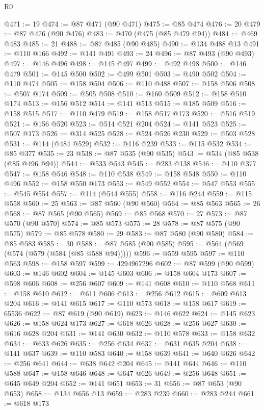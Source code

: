 \begin{lexlean}{R0}
\begin{coremodule}
@471 := 19
@474 := @87 @471 (@90 @471)
@475 := @85 @474
@476 := 20
@479 := @87 @476 (@90 @476)
@483 := @470 (@475 (@85 @479 @94))
@484 := @469 @483
@485 := 21
@488 := @87 @485 (@90 @485)
@490 := @134 @488 @13
@491 := @110 @166
@492 := @141 @491
@493 := 24
@496 := @87 @493 (@90 @493)
@497 := @146 @496
@498 := @145 @497
@499 := @492 @498
@500 := @146 @479
@501 := @145 @500
@502 := @499 @501
@503 := @490 @502
@504 := @110 @474
@505 := @158 @504
@506 := @110 @488
@507 := @158 @506
@508 := @507 @174
@509 := @505 @508
@510 := @160 @509
@512 := @158 @510 @174
@513 := @156 @512
@514 := @141 @513
@515 := @185 @509
@516 := @158 @515
@517 := @110 @479
@519 := @158 @517 @173
@520 := @516 @519
@521 := @156 @520
@523 := @514 @521 @204
@524 := @141 @523
@525 := @507 @173
@526 := @314 @525
@528 := @524 @526 @230
@529 := @503 @528
@531 := @114 (@484 @529)
@532 := @116 @239
@533 := @115 @532
@534 := @85 @377
@535 := 23
@538 := @87 @535 (@90 @535)
@543 := @534 (@85 @538 (@85 @496 @94))
@544 := @533 @543
@545 := @283 @138
@546 := @110 @377
@547 := @158 @546
@548 := @110 @538
@549 := @158 @548
@550 := @110 @496
@552 := @158 @550 @173
@553 := @549 @552
@554 := @547 @553
@555 := @545 @554
@557 := @114 (@544 @555)
@558 := @116 @244
@559 := @115 @558
@560 := 25
@563 := @87 @560 (@90 @560)
@564 := @85 @563
@565 := 26
@568 := @87 @565 (@90 @565)
@569 := @85 @568
@570 := 27
@573 := @87 @570 (@90 @570)
@574 := @85 @573
@575 := 28
@578 := @87 @575 (@90 @575)
@579 := @85 @578
@580 := 29
@583 := @87 @580 (@90 @580)
@584 := @85 @583
@585 := 30
@588 := @87 @585 (@90 @585)
@595 := @564 (@569 (@574 (@579 (@584 (@85 @588 @94)))))
@596 := @559 @595
@597 := @110 @563
@598 := @158 @597
@599 := 4294967296
@602 := @87 @599 (@90 @599)
@603 := @146 @602
@604 := @145 @603
@606 := @158 @604 @173
@607 := @598 @606
@608 := @256 @607
@609 := @141 @608
@610 := @110 @568
@611 := @158 @610
@612 := @611 @606
@613 := @256 @612
@615 := @609 @613 @204
@616 := @141 @615
@617 := @110 @573
@618 := @158 @617
@619 := 65536
@622 := @87 @619 (@90 @619)
@623 := @146 @622
@624 := @145 @623
@626 := @158 @624 @173
@627 := @618 @626
@628 := @256 @627
@630 := @616 @628 @204
@631 := @141 @630
@632 := @110 @578
@633 := @158 @632
@634 := @633 @626
@635 := @256 @634
@637 := @631 @635 @204
@638 := @141 @637
@639 := @110 @583
@640 := @158 @639
@641 := @640 @626
@642 := @256 @641
@644 := @638 @642 @204
@645 := @141 @644
@646 := @110 @588
@647 := @158 @646
@648 := @647 @626
@649 := @256 @648
@651 := @645 @649 @204
@652 := @141 @651
@653 := 31
@656 := @87 @653 (@90 @653)
@658 := @134 @656 @13
@659 := @283 @239
@660 := @283 @244
@661 := @618 @173

\end{coremodule}
\end{lexlean}
